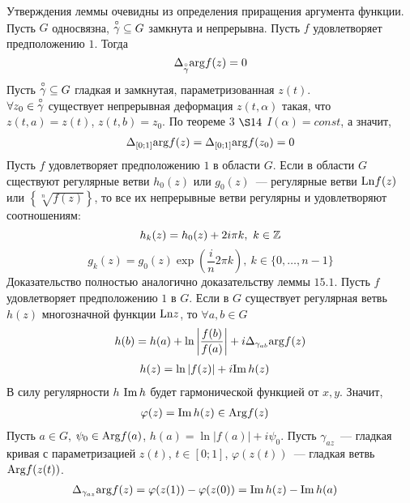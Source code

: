 \pr
Утверждения леммы очевидны из определения приращения аргумента функции.
\lemma
Пусть $G$ односвязна, $\overset{\circ}{\gamma} \subseteq G$ замкнута и непрерывна.
Пусть $f$ удовлетворяет предположению $1$. Тогда
\begin{equation}\label{(16.8)}
    \Delta_{\overset{\circ}{\gamma}}\mathrm{arg} f(z) = 0
\end{equation}
\pr
Пусть $\overset {\circ}{\gamma} \subseteq G$ гладкая и замкнутая, параметризованная
$z(t)$.
\\
$\forall z_0 \in \overset{\circ}{\gamma}$ существует непрерывная деформация $z(t,
\alpha)$ такая, что $z(t,a) = z(t)$, $z(t,b) = z_0$. По теореме $3$ $\S 14$
$I(\alpha) = const$, а значит,
\begin{align*}
  \Delta_{[0;1]}\mathrm{arg} f(z) = \Delta_{[0;1]}\mathrm{arg} f(z_0) = 0
\end{align*}
\lemma
Пусть $f$ удовлетворяет предположению $1$ в области $G$. Если в области $G$
сществуют регулярные ветви $h_0(z)$ или $g_0(z)$~--- регулярные ветви $\mathrm{Ln} f(z)$
или $\left\{ \sqrt[n]{f(z)} \right\}$, то все их непрерывные ветви регулярны и
удовлетворяют соотношениям:
\begin{equation}\label{(16.9)}
    h_k(z) = h_0(z) + 2i \pi k, \ k \in \mathbb{Z}
\end{equation}
\begin{equation}\label{(16.10)}
    g_k(z) = g_0(z) \exp\left( \frac{i}{n} 2 \pi k\right), \ k \in \{0, \dots, n-1\}
\end{equation}
\pr
Доказательство полностью аналогично доказательству леммы $15.1$.
\lemma
Пусть $f$ удовлетворяет предположению $1$ в $G$. Если в $G$ существует
регулярная ветвь $h(z)$ многозначной функции $\mathrm{Ln} z$, то $\forall a,b \in G$
\begin{equation}\label{(16.11)}
    h(b) = h(a) + \ln \left| \frac{f(b)}{f(a)} \right| + i \Delta_{\gamma_{ab}}\mathrm{arg} f(z)
\end{equation}
\pr
\begin{align*}
  & h(z) = \ln \left| f(z) \right| + i \mathrm{Im}\, h(z)
\end{align*}
В силу регулярности $h$ $\mathrm{Im}\, h$ будет гармонической функцией от $x, y$. Значит,
\begin{align*}
  & \varphi(z) = \mathrm{Im}\, h(z) \in \mathrm{Arg} f(z)
\end{align*}
Пусть $a \in G$, $\psi_0 \in \mathrm{Arg} f(a)$, $h(a) = \ln \left| f(a) \right| + i
\psi_0$. Пусть $\gamma_{az}$~--- гладкая кривая с параметризацией $z(t)$, $t \in
[0;1]$, $\varphi(z(t))$~--- гладкая ветвь $\mathrm{Arg} f(z(t))$.
\begin{align*}
  & \Delta_{\gamma_{az}}\mathrm{arg} f(z) = \varphi(z(1))-\varphi(z(0)) = \mathrm{Im}\, h(z) - \mathrm{Im}\, h(a)
\end{align*}
